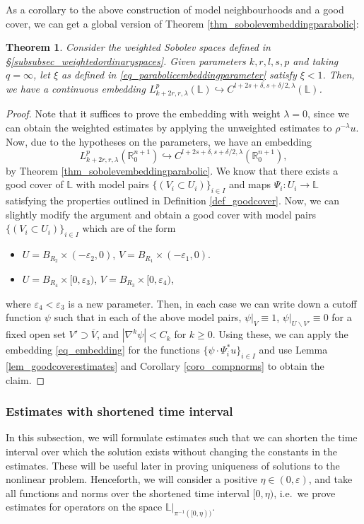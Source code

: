 \documentclass[10pt, a4paper]{article}
\theoremstyle{plain}%
\newtheorem{theorem}{Theorem}[section]
\theoremstyle{definition}
\numberwithin{figure}{section}
\numberwithin{equation}{section}
\newcommand{\bL}{\mathbb{L}}
\newcommand{\bR}{\mathbb{R}}
\newcommand{\rt}{\rightarrow}
\newcommand{\ep}{\varepsilon}
\begin{document}
As a corollary to the above construction of model neighbourhoods and a good cover, we can get a global version of Theorem \ref{thm_sobolevembeddingparabolic}:
\begin{theorem}
	Consider the weighted Sobolev spaces defined in \S \ref{subsubsec_weightedordinaryspaces}. Given parameters $k,r,l,s,p$ and taking $q=\infty$, let $\xi$ as defined in \eqref{eq_parabolicembeddingparameter} satisfy $\xi<1$. Then, we have a continuous embedding $L^p_{k+2r,r,\lambda}(\bL) \hookrightarrow C^{l+2s+\delta,s+\delta/2,\lambda}(\bL)$.
\end{theorem}
\begin{proof}
	Note that it suffices to prove the embedding with weight $\lambda=0$, since we can obtain the weighted estimates by applying the unweighted estimates to $\rho^{-\lambda}u$. Now, due to the hypotheses on the parameters, we have an embedding \begin{equation}\label{eq_embedding}
	L^p_{k+2r,r,\lambda}(\bR^{n+1}_0) \hookrightarrow C^{l+2s+\delta,s+\delta/2,\lambda}(\bR^{n+1}_0),
	\end{equation}
	 by Theorem \ref{thm_sobolevembeddingparabolic}. We know that there exists a good cover of $\bL$ with model pairs $\{(V_i\subset U_i)\}_{i\in I}$ and maps $\Psi_i : U_i \rt \bL$ satisfying the properties outlined in Definition \ref{def_goodcover}. Now, we can slightly modify the argument and obtain a good cover with model pairs $\{(V_i\subset U_i)\}_{i\in I}$ which are of the form \begin{itemize}
	 	\item $U=B_{R_2}\times (-\ep_2,0)$, $V=B_{R_1}\times (-\ep_1,0)$.
	 	\item $U=B_{R_4}\times[0,\ep_3)$, $V=B_{R_3}\times[0,\ep_4)$,
	 \end{itemize}
	 where $\ep_4<\ep_3$ is a new parameter. Then, in each case we can write down a cutoff function $\psi$ such that in each of the above model pairs, $\psi|_{V}\equiv 1$, $\psi|_{U\backslash V'}\equiv 0$ for a fixed open set $V' \supset  \overline{V}$, and $|\nabla^k\psi|<C_k$ for $k\geq 0$. Using these, we can apply the embedding \eqref{eq_embedding} for the functions $\{\psi\cdot\Psi_i^*u\}_{i\in I}$ and use Lemma \ref{lem_goodcoverestimates} and Corollary \ref{coro_compnorms} to obtain the claim. 
\end{proof}


\subsubsection{Estimates with shortened time interval}
In this subsection, we will formulate estimates such that we can shorten the time interval over which the solution exists without changing the constants in the estimates. These will be useful later in proving uniqueness of solutions to the nonlinear problem. Henceforth, we will consider a positive $\eta \in (0,\ep)$, and take all functions and norms over the shortened time interval $[0,\eta)$, i.e.\ we prove estimates for operators on the space $\bL|_{\pi^{-1}([0,\eta))}$. 
\end{document}
